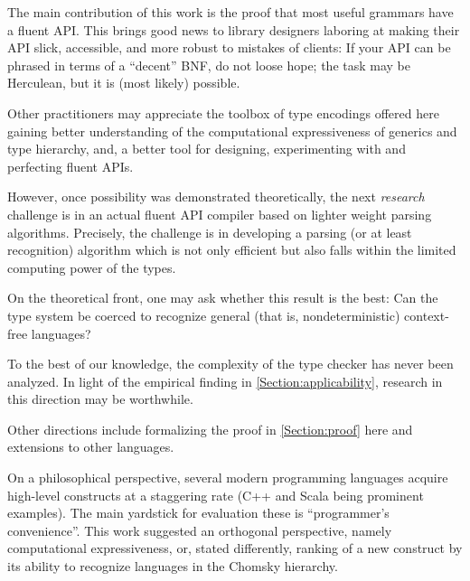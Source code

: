 The main contribution of this work is the proof that 
  most useful grammars have a fluent API.
This brings good news to library designers laboring
  at making their API slick, accessible, and more
  robust to mistakes of clients: 
If your API can be phrased in terms of a ``decent''
  BNF, do not loose hope; the task may be Herculean, but it is (most likely) possible. 

Other practitioners may appreciate the toolbox of type encodings offered here 
  gaining better understanding of the computational expressiveness of
  \Java generics and type hierarchy, and, a better tool
  for designing, experimenting with and perfecting fluent APIs.

However, once possibility was demonstrated theoretically, the next \emph{research} 
    challenge is in an actual fluent API compiler based on lighter weight
  parsing algorithms.
Precisely, the challenge 
  is in developing a parsing (or at least recognition) 
  algorithm which is not only efficient but also falls within the limited computing power of the \Java types. 

On the theoretical front, one may ask whether 
  this result is the best:
Can the \Java type system be coerced to recognize
  general (that is, nondeterministic) context-free languages?

To the best of our knowledge, 
  the complexity of the \Java type checker has never been analyzed. 
In light of the empirical finding in \cref{Section:applicability},
  research in this direction may be worthwhile. 

Other directions include 
  formalizing the proof in \cref{Section:proof} here and 
  extensions to other languages.

On a philosophical perspective, several modern programming languages 
  acquire high-level constructs at a staggering rate
  (C++ and Scala being prominent examples). 
The main yardstick for evaluation these 
  is ``programmer's convenience''.
This work suggested an orthogonal perspective, namely 
  computational expressiveness, or, stated differently, 
    ranking of a new construct by its ability to recognize languages 
    in the Chomsky hierarchy.
